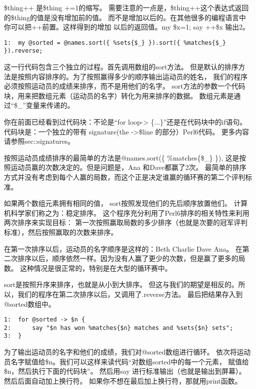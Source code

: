 \documentclass{ctexart}
\begin{document}
\$thing++ 是\$thing +=1的缩写。
需要注意的一点是，\$thing++这个表达式返回的\$thing的值是没有增加前的值。
而不是增加以后的。在其他很多的编程语言中你可以把++前置。这样得到的增加
以后的返回值。my \$x=1; say ++\$x 输出2。


\begin{lstlisting}
1:  my @sorted = @names.sort({ %sets{$_} }).sort({ %matches{$_} }).reverse;
\end{lstlisting}

这一行代码包含三个独立的过程。首先调用数组的sort方法。
但是默认的排序方法是按照内容排序的。为了按照赢得多少的顺序输出运动员的姓名，
我们的程序必须按照运动员的成绩来排序，而不是用他们的名字。
sort方法的参数一个代码块，用来把数组元素（运动员的名字）转化为用来排序的数据。
数组元素是通过“\$\_”变量来传递的。

你在前面已经看到过代码块：不论是“for loop-> \{...\}”还是在代码块中的if语句。
代码块是：一个独立的带有 signature(the ->\$line 的部分）Perl6代码。
更多内容请参照sec::signatures。

按照运动员成绩排序的最简单的方法是@names.sort(\{ \%matches\{\$\_\} \}),
这是按照运动员赢的次数决定的。但是问题是，Ana 和Dave都赢了2次。
最简单的排序方式并没有考虑到每个人赢的局数，而这个正是决定谁赢的循环赛的第二个评判标准。

如果两个数组元素拥有相同的值， sort按照发现他们的先后顺序放置他们。
计算机科学家们称之为：稳定排序。
这个程序充分利用了Perl6排序的相关特性来利用两次排序来实现目标：
第一次按照赢取局数的多少排序（也就是次要的冠军评判标准），然后按照赢取的次数来排序。

在第一次排序以后，运动员的名字顺序是这样的：Beth Charlie Dave Ana。
在第二次排序以后，顺序依然一样。因为没有人赢了更少的次数，但是赢了更多的局数。
这种情况是很正常的，特别是在大型的循环赛中。

sort是按照升序来排序，也就是从小到大排序。
但这与我们的期望是相反的。所以，我们的程序在第二次排序以后，又调用了.reverse方法。
最后把结果存入到@sorted数组中。


\begin{lstlisting}
1:  for @sorted -> $n {
2:      say "$n has won %matches{$n} matches and %sets{$n} sets";
3:  }
\end{lstlisting}

为了输出运动员的名字和他们的成绩，我们对@sorted数组进行循环。
依次将运动员名字赋值给\$n。我们可以这样来读代码“对数组sorted中的每一个元素，
赋值给\$n，然后执行下面的代码块”。
然后用say 进行标准输出（也就是输出到屏幕）。
然后后面自动加上换行符。
如果你不想在最后加上换行符，那就用print函数。
\end{document}
